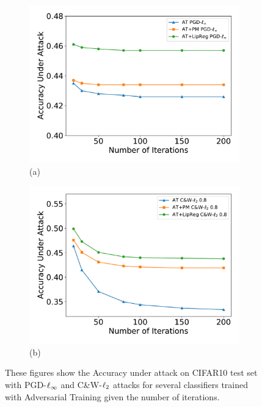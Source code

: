 \begin{figure}[ht]
   \centering
   \begin{subfigure}[b]{0.49\textwidth}
       \centering
       \includegraphics[width=\textwidth]{figures/chapter4/attacks_iter_pgd.pdf}\\(a)
   \end{subfigure}
   \hfill
   \begin{subfigure}[b]{0.49\textwidth}
       \centering
       \includegraphics[width=\textwidth]{figures/chapter4/attacks_iter_cw.pdf}\\(b)
   \end{subfigure}
   \caption{These figures show the Accuracy under attack on CIFAR10 test set with PGD-$\ell_\infty$ and C\&W-$\ell_2$ attacks for several classifiers trained with Adversarial Training given the number of iterations.}
   \label{figure:attacks_iter}
\end{figure}


